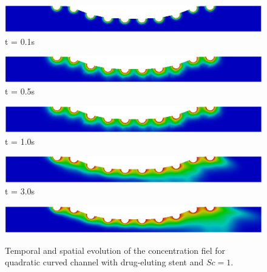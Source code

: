 \vspace{1cm}
\begin{figure}[H]
     \caption{
Temporal and spatial evolution of the concentration fiel for quadratic curved channel with drug-eluting stent and $Sc=1$.}
     \begin{minipage}{.50\linewidth}
      \centering
      \includegraphics[scale=0.18]{./02_chaps/cap_solution/figure/conc1_quadCurvedStrut1.png}\\
      t = 0.1s
     \end{minipage}%
     \begin{minipage}{.50\linewidth}
      \centering
      \includegraphics[scale=0.18]{./02_chaps/cap_solution/figure/conc1_quadCurvedStrut2.png}\\
      t = 0.5s
     \end{minipage}
     \begin{minipage}{.50\linewidth}
     \medskip
      \centering
      \includegraphics[scale=0.18]{./02_chaps/cap_solution/figure/conc1_quadCurvedStrut3.png}\\
      t = 1.0s
     \end{minipage}%
     \begin{minipage}{.50\linewidth}
     \medskip
      \centering
      \includegraphics[scale=0.18]{./02_chaps/cap_solution/figure/conc1_quadCurvedStrut4.png}\\
      t = 3.0s
     \end{minipage}
     \begin{minipage}{.50\linewidth}
      \centering
      \includegraphics[scale=0.18]{./02_chaps/cap_solution/figure/conc1_quadCurvedStrut5.png}\\

\end{minipage}
\end{figure}
